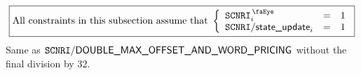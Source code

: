 \[
	\boxed{\text{All constraints in this subsection assume that }
	\left\{ \begin{array}{lcl}
		\isMxpScenario             _{i} & = & 1 \\
		\locMxpScenarioStateUpdate _{i} & = & 1 \\
	\end{array} \right. }
\]
Same as $\texttt{SCNRI}\textsf{/}{\textsf{DOUBLE\_MAX\_OFFSET\_AND\_WORD\_PRICING}}$ without the final division by 32.


